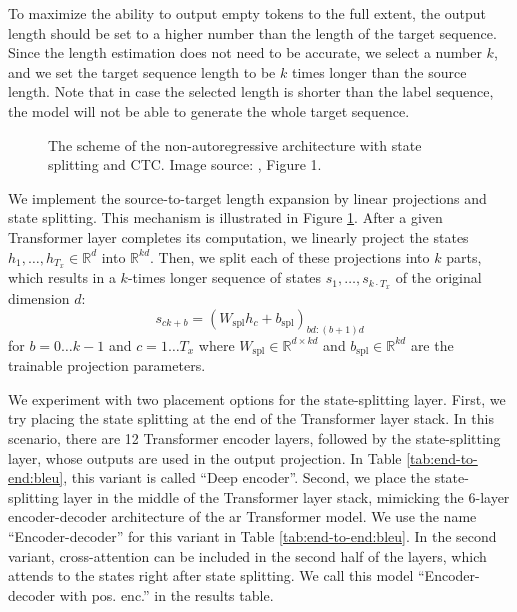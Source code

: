 To maximize the ability to output empty tokens to the full extent, the output
length should be set to a higher number than the length of the target sequence.
Since the length estimation does not need to be accurate, we select a number
$k$, and we set the target sequence length to be $k$ times longer than the
source length. Note that in case the selected length is shorter than the label
sequence, the model will not be able to generate the whole target sequence.

\begin{figure}
  \centering
  \scalebox{0.7}{%
  
}
  \caption{The scheme of the non-autoregressive architecture with
    state splitting and CTC. Image source: \citet{libovicky-helcl-2018-end},
    Figure 1.}%
  \label{fig:state-splitting}
\end{figure}


We implement the source-to-target length expansion by linear projections and
state splitting. This mechanism is illustrated in Figure
\ref{fig:state-splitting}. After a given Transformer layer completes its
computation, we linearly project the states
$h_1, \ldots, h_{T_x} \in \mathbb{R}^d$ into $\mathbb{R}^{kd}$. Then, we split
each of these projections into $k$ parts, which results in a $k$-times longer
sequence of states $s_1, \ldots, s_{k \cdot T_x}$ of the original dimension
$d$:
%
\begin{equation}
  s_{ck+b} = \left( W_{\text{spl}} h_c + b_{\text{spl}} \right)_{bd:(b+1)d}
\end{equation}
%
for $b=0 \ldots k-1$ and $c=1 \ldots T_x$ where
$W_{\text{spl}} \in \mathbb{R}^{d \times kd}$ and
$b_{\text{spl}} \in \mathbb{R}^{kd}$ are the trainable projection parameters.

We experiment with two placement options for the state-splitting layer. First,
we try placing the state splitting at the end of the Transformer layer
stack. In this scenario, there are 12 Transformer encoder layers, followed by
the state-splitting layer, whose outputs are used in the output projection. In
Table \ref{tab:end-to-end:bleu}, this variant is called ``Deep
encoder''. Second, we place the state-splitting layer in the middle of the
Transformer layer stack, mimicking the 6-layer encoder-decoder architecture of
the \ac{ar} Transformer model. We use the name ``Encoder-decoder'' for this
variant in Table \ref{tab:end-to-end:bleu}. In the second variant,
cross-attention can be included in the second half of the layers, which attends
to the states right after state splitting. We call this model ``Encoder-decoder
with pos. enc.'' in the results table.


